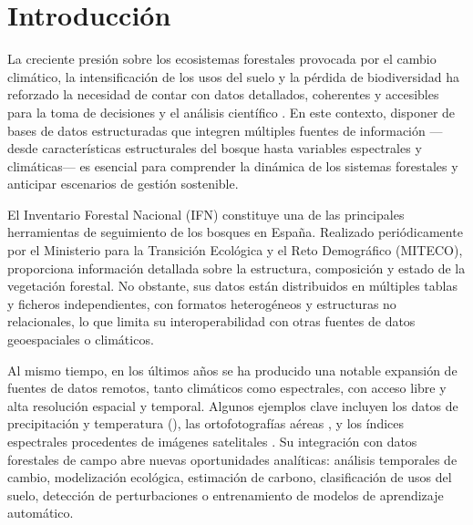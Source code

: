 \section{Introducción}


La creciente presión sobre los ecosistemas forestales provocada por el cambio climático, la intensificación de los usos del suelo y la pérdida de biodiversidad ha reforzado la necesidad de contar con datos detallados, coherentes y accesibles para la toma de decisiones y el análisis científico \cite{cmnucc1992, UNFCCC1997}. En este contexto, disponer de bases de datos estructuradas que integren múltiples fuentes de información —desde características estructurales del bosque hasta variables espectrales y climáticas— es esencial para comprender la dinámica de los sistemas forestales y anticipar escenarios de gestión sostenible.

\medskip

El Inventario Forestal Nacional (IFN) \cite{ifn} constituye una de las principales herramientas de seguimiento de los bosques en España. Realizado periódicamente por el Ministerio para la Transición Ecológica y el Reto Demográfico (MITECO), proporciona información detallada sobre la estructura, composición y estado de la vegetación forestal. No obstante, sus datos están distribuidos en múltiples tablas y ficheros independientes, con formatos heterogéneos y estructuras no relacionales, lo que limita su interoperabilidad con otras fuentes de datos geoespaciales o climáticos.

\medskip

Al mismo tiempo, en los últimos años se ha producido una notable expansión de fuentes de datos remotos, tanto climáticos como espectrales, con acceso libre y alta resolución espacial y temporal. Algunos ejemplos clave incluyen los datos de precipitación y temperatura (\cite{copernicus_era5_land_daily}), las ortofotografías aéreas \cite{ign_pnoa}, y los índices espectrales procedentes de imágenes satelitales \cite{landsat5_data, landsat7_data, sentinel_hub_ndii, eos_indices_vegetacion}. Su integración con datos forestales de campo abre nuevas oportunidades analíticas: análisis temporales de cambio, modelización ecológica, estimación de carbono, clasificación de usos del suelo, detección de perturbaciones o entrenamiento de modelos de aprendizaje automático.

